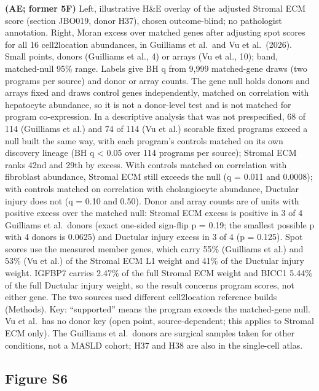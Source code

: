 \textbf{(AE; former 5F)} Left, illustrative H\&E overlay of the adjusted Stromal ECM score (section JBO019, donor H37), chosen outcome-blind; no pathologist annotation. Right, Moran excess over matched genes after adjusting spot scores for all 16 cell2location abundances, in Guilliams et al.~and Vu et al.~(2026). Small points, donors (Guilliams et al., 4) or arrays (Vu et al., 10); band, matched-null 95\% range. Labels give BH q from 9,999 matched-gene draws (two programs per source) and donor or array counts. The gene null holds donors and arrays fixed and draws control genes independently, matched on correlation with hepatocyte abundance, so it is not a donor-level test and is not matched for program co-expression. In a descriptive analysis that was not prespecified, 68 of 114 (Guilliams et al.) and 74 of 114 (Vu et al.) scorable fixed programs exceed a null built the same way, with each program's controls matched on its own discovery lineage (BH q \textless{} 0.05 over 114 programs per source); Stromal ECM ranks 42nd and 29th by excess. With controls matched on correlation with fibroblast abundance, Stromal ECM still exceeds the null (q = 0.011 and 0.0008); with controls matched on correlation with cholangiocyte abundance, Ductular injury does not (q = 0.10 and 0.50). Donor and array counts are of units with positive excess over the matched null: Stromal ECM excess is positive in 3 of 4 Guilliams et al.~donors (exact one-sided sign-flip p = 0.19; the smallest possible p with 4 donors is 0.0625) and Ductular injury excess in 3 of 4 (p = 0.125). Spot scores use the measured member genes, which carry 55\% (Guilliams et al.) and 53\% (Vu et al.) of the Stromal ECM L1 weight and 41\% of the Ductular injury weight. IGFBP7 carries 2.47\% of the full Stromal ECM weight and BICC1 5.44\% of the full Ductular injury weight, so the result concerns program scores, not either gene. The two sources used different cell2location reference builds (Methods). Key: ``supported'' means the program exceeds the matched-gene null. Vu et al.~has no donor key (open point, source-dependent; this applies to Stromal ECM only). The Guilliams et al.~donors are surgical samples taken for other conditions, not a MASLD cohort; H37 and H38 are also in the single-cell atlas.

\subsection{Figure S6}\label{figure-s6}

